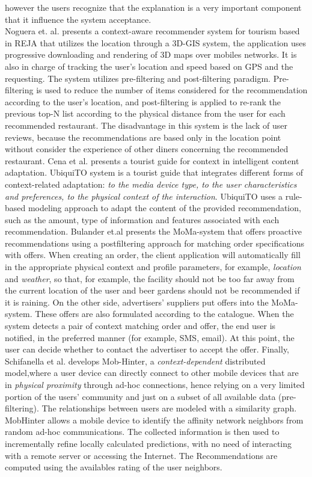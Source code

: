 however the users recognize that the explanation is a very important
component that it influence the system acceptance. \\ Noguera et. al.
\cite{noguera2012mobile} presents a context-aware recommender system
for tourism based in REJA that utilizes the location through a 3D-GIS
system, the application uses progressive downloading and rendering of
3D maps over mobiles networks. It is also in charge of tracking the
user’s location and speed based on GPS and the requesting. The system
utilizes pre-filtering and post-filtering paradigm. Pre-filtering is
used to reduce the number of items considered for the recommendation
according to the user’s location, and  post-filtering is applied to
re-rank the previous top-N list according to the physical distance
from the user for each recommended restaurant. The disadvantage in this
system is the lack of user reviews, because the recommendations are
based only in the location point without consider the experience of
other diners concerning the recommended restaurant. 
Cena et al.\cite{cena2006integrating} presents a tourist guide for
context in intelligent content adaptation. UbiquiTO system is a
tourist guide that integrates different forms of context-related
adaptation: \textit{to the media device type, to the user characteristics and
preferences, to the physical context of the interaction}. UbiquiTO uses
a rule-based modeling approach to adapt the content of the provided
recommendation, such as the amount, type of information and features
associated with each recommendation. 
Bulander et.al\cite{bulander2005comparison} presents the MoMa-system that
offers proactive recommendations using a postfiltering approach for
matching order specifications with offers. When creating an order, the
client application will automatically fill in the appropriate physical
context and profile parameters, for example, \textit{location} and \textit{weather},
so that, for example, the facility should not be too far away from the
current location of the user and beer gardens should not be
recommended if it is raining. On the other side, advertisers’
suppliers put offers into the MoMa-system. These offers are also
formulated according to the catalogue. When the system detects a pair
of context matching order and offer, the end user is notified, in the
preferred manner (for example, SMS, email). At this point, the user
can decide whether to contact the advertiser to accept the offer.
Finally, Schifanella et al.\cite{schifanella2008mobhinter} develops
Mob-Hinter, a \textit{context-dependent} distributed model,where a user device
can directly connect to other mobile devices that are in \textit{physical
proximity} through ad-hoc connections, hence relying on a very limited
portion of the users’ community and just on a subset of all available
data (pre-filtering). The relationships between users are modeled with
a similarity graph. MobHinter allows a mobile device to identify the
affinity network neighbors from random ad-hoc communications. The
collected information is then used to incrementally refine locally
calculated predictions, with no need of interacting with a remote
server or accessing the Internet. The Recommendations are computed
using the availables rating of the user neighbors.

